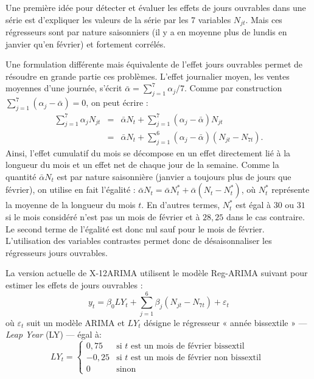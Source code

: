 \documentclass[11pt,french,french]{article}
\begin{document}
Une première idée pour détecter et évaluer les effets de jours ouvrables dans une série est d'expliquer les valeurs de la série par les 7 variables \(N_{jt}\).
Mais ces régresseurs sont par nature saisonniers (il y a en moyenne plus de lundis en janvier qu'en février) et fortement corrélés.

Une formulation différente mais équivalente de l'effet jours ouvrables permet de résoudre en grande partie ces problèmes.
L'effet journalier moyen, les ventes moyennes d'une journée, s'écrit \(\bar{\alpha} = \sum_{j=1}^7 \alpha_j /7\).
Comme par construction \(\sum_{j=1}^7 \left(\alpha_j-\bar{\alpha}\right) = 0\), on peut écrire :
\begin{eqnarray*}
\sum_{j=1}^7 \alpha_j N_{jt} & = & \bar{\alpha}N_t + \sum_{j=1}^7 \left(\alpha_j-\bar{\alpha}\right) N_{jt} \nonumber \\
& = &  \bar{\alpha}N_t + \sum_{j=1}^6 \left(\alpha_j-\bar{\alpha}\right) \left(N_{jt} - N_{7t}\right).
\end{eqnarray*}
Ainsi, l'effet cumulatif du mois se décompose en un effet directement lié à la longueur du mois et un effet net de chaque jour de la semaine.
Comme la quantité \(\bar{\alpha}N_t\) est par nature saisonnière (janvier a toujours plus de jours que février), on utilise en fait l'égalité : \(\bar{\alpha}N_t = \bar{\alpha}N_t^* + \bar{\alpha}\left(N_t-N_t^*\right)\), où \(N_t^*\)
représente la moyenne de la longueur du mois \(t\).
En d'autres termes, \(N_t^*\) est égal à \(30\) ou \(31\) si le mois considéré n'est pas un mois de février et à \(28,25\) dans le cas contraire.
Le second terme de l'égalité est donc nul sauf pour le mois de février.
L'utilisation des variables contrastes permet donc de désaisonnaliser les régresseurs jours ouvrables.

La version actuelle de X-12ARIMA utilisent le modèle Reg-ARIMA suivant pour estimer les effets de jours ouvrables :
\begin{equation}
y_t=\beta_0 LY_t + \sum_{j=1}^{6} \beta_j \left(N_{jt} - N_{7t}\right) + \varepsilon_t
    \label{eq:eqcjotd}
\end{equation}
où \(\varepsilon_t\) suit un modèle ARIMA et \(LY_t\) désigne le régresseur « année bissextile » --- \emph{Leap Year} (LY) --- égal à:
\[
LY_{t} = \left\{ \begin{array}{rl} 
                0,75 & \mbox{si } t \mbox{ est un mois de février bissextil } \\
                -0,25 & \mbox{si } t \mbox{ est un mois de février non bissextil } \\
                0 & \mbox{sinon}
               \end{array}
         \right.
\]
\end{document}
